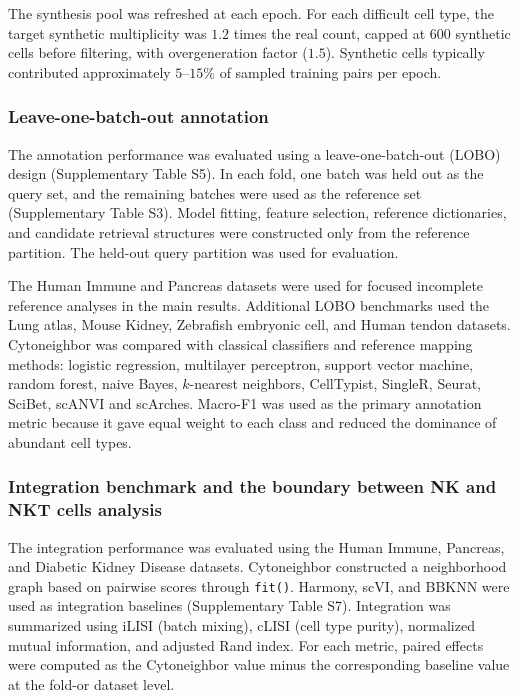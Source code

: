 \documentclass[11pt]{article}
\begin{document}
The synthesis pool was refreshed at each epoch. For each difficult cell type, the target synthetic multiplicity was $1.2$ times the real count, capped at $600$ synthetic cells before filtering, with overgeneration factor ($1.5$). Synthetic cells typically contributed approximately $5$--$15\%$ of sampled training pairs per epoch.

\subsubsection*{Leave-one-batch-out annotation}

The annotation performance was evaluated using a leave-one-batch-out (LOBO) design (Supplementary Table S5). In each fold, one batch was held out as the query set, and the remaining batches were used as the reference set (Supplementary Table S3). Model fitting, feature selection, reference dictionaries, and candidate retrieval structures were constructed only from the reference partition. The held-out query partition was used for evaluation.

The Human Immune and Pancreas datasets were used for focused incomplete reference analyses in the main results. Additional LOBO benchmarks used the Lung atlas, Mouse Kidney, Zebrafish embryonic cell, and Human tendon datasets. Cytoneighbor was compared with classical classifiers and reference mapping methods: logistic regression, multilayer perceptron, support vector machine, random forest, naive Bayes, $k$-nearest neighbors, CellTypist, SingleR, Seurat, SciBet, scANVI\cite{Xu2021scANVI} and scArches\cite{Lotfollahi2022scArches}. Macro-F1 was used as the primary annotation metric because it gave equal weight to each class and reduced the dominance of abundant cell types.

\subsubsection*{Integration benchmark and the boundary between NK and NKT cells analysis}

The integration performance was evaluated using the Human Immune, Pancreas, and Diabetic Kidney Disease datasets. Cytoneighbor constructed a neighborhood graph based on pairwise scores through \texttt{fit()}. Harmony, scVI, and BBKNN were used as integration baselines (Supplementary Table S7). Integration was summarized using iLISI (batch mixing), cLISI (cell type purity), normalized mutual information, and adjusted Rand index. For each metric, paired effects were computed as the Cytoneighbor value minus the corresponding baseline value at the fold-or dataset level.
\end{document}
